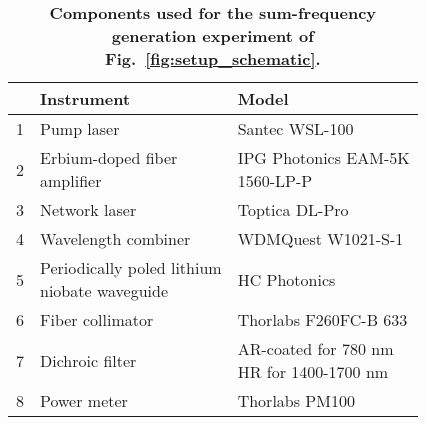 \documentclass[floatfix,reprint,superscriptaddress,amsmath,amssymb,aps]{revtex4-2}
\begin{document}
\begin{center}
\begin{table}
\renewcommand{\arraystretch}{1.5}
\setlength{\tabcolsep}{1.0ex}
\begin{tabular}{lll}
\toprule
& \textbf{Instrument} &	\textbf{Model}	
\\ \midrule
1 & Pump laser &		Santec WSL-100	
\\
2 & \makecell[l]{Erbium-doped fiber\\ amplifier} & \makecell[l]{IPG Photonics EAM-5K \\ 1560-LP-P}
\\
3 & Network laser &		Toptica DL-Pro	
\\
4 & Wavelength combiner &	WDMQuest W1021-S-1 	
\\
5 & \makecell[l]{Periodically poled lithium \\niobate waveguide} & \makecell[l]{HC Photonics\\ }
\\
6 & Fiber collimator & Thorlabs F260FC-B 633 
\\
7 & Dichroic filter & \makecell[l]{AR-coated for 780 nm \\HR for 1400-1700 nm}
\\
8 & Power meter & Thorlabs PM100
\\ \bottomrule
\end{tabular}
\caption{
\label{tab:component_list}
\textbf{Components used for the sum-frequency generation experiment of Fig.~\ref{fig:setup_schematic}.} 
}
\end{table}
\end{center}
\end{document}

